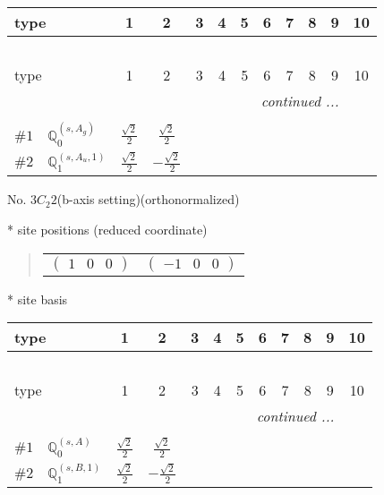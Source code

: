 \documentclass[fleqn,9pt,landscape]{jsarticle}
\begin{document}
\begin{center}
\renewcommand{\arraystretch}{1.3}
\begin{longtable}{lcccccccccc}
 \hline \hline
type & 1 & 2 & 3 & 4 & 5 & 6 & 7 & 8 & 9 & 10 \\ \hline \endfirsthead

\multicolumn{10}{l}{\tablename\ \thetable{}} \\
 \hline \hline
type & 1 & 2 & 3 & 4 & 5 & 6 & 7 & 8 & 9 & 10 \\ \hline \endhead

 \hline \hline
\multicolumn{10}{r}{\footnotesize\it continued ...} \\ \endfoot

 \hline \hline
\multicolumn{10}{r}{} \\ \endlastfoot

$ \#1\quad \mathbb{Q}_{0}^{(s,A_{g})} $ & $ \frac{\sqrt{2}}{2} $ & $ \frac{\sqrt{2}}{2} $ \\ \hline
$ \#2\quad \mathbb{Q}_{1}^{(s,A_{u},1)} $ & $ \frac{\sqrt{2}}{2} $ & $ - \frac{\sqrt{2}}{2} $ \\
\end{longtable}
\end{center}
\newpage
\begin{center}
\LARGE
No. 3\quad$C_{2}$\quad$2$\quad(b-axis setting)\quad[ monoclinic ] (orthonormalized)
\end{center}
\vspace{5mm}
* site positions (reduced coordinate)
\begin{quote}
\begin{tabular}{cc}
$ \begin{pmatrix} 1 & 0 & 0 \end{pmatrix} $ & $ \begin{pmatrix} -1 & 0 & 0 \end{pmatrix} $
\end{tabular}
\end{quote}
* site basis
\begin{center}
\renewcommand{\arraystretch}{1.3}
\begin{longtable}{lcccccccccc}
 \hline \hline
type & 1 & 2 & 3 & 4 & 5 & 6 & 7 & 8 & 9 & 10 \\ \hline \endfirsthead

\multicolumn{10}{l}{\tablename\ \thetable{}} \\
 \hline \hline
type & 1 & 2 & 3 & 4 & 5 & 6 & 7 & 8 & 9 & 10 \\ \hline \endhead

 \hline \hline
\multicolumn{10}{r}{\footnotesize\it continued ...} \\ \endfoot

 \hline \hline
\multicolumn{10}{r}{} \\ \endlastfoot

$ \#1\quad \mathbb{Q}_{0}^{(s,A)} $ & $ \frac{\sqrt{2}}{2} $ & $ \frac{\sqrt{2}}{2} $ \\ \hline
$ \#2\quad \mathbb{Q}_{1}^{(s,B,1)} $ & $ \frac{\sqrt{2}}{2} $ & $ - \frac{\sqrt{2}}{2} $ \\
\end{longtable}
\end{center}
\end{document}
